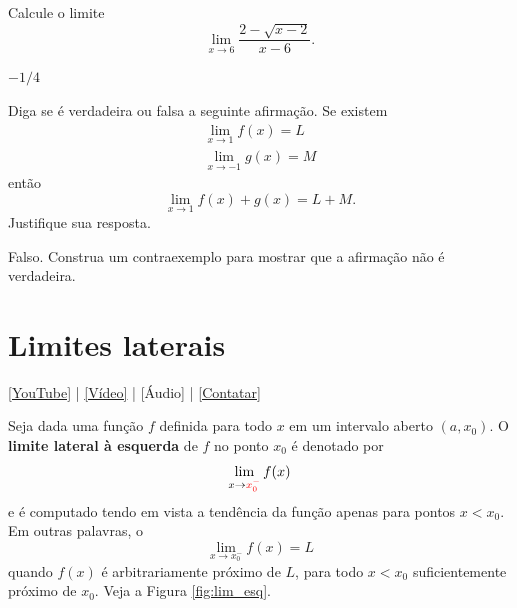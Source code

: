 \begin{exer}
  Calcule o limite
  \begin{equation}
    \lim_{x\to 6} \frac{2-\sqrt{x-2}}{x-6}.
  \end{equation}
\end{exer}
\begin{resp}
  $-1/4$
\end{resp}

\begin{exer}
  Diga se é verdadeira ou falsa a seguinte afirmação. Se existem
  \begin{gather}
    \lim_{x\to 1} f(x) = L\\
    \lim_{x\to -1} g(x) = M
  \end{gather}
  então
  \begin{equation}
    \lim_{x\to 1} f(x) + g(x) = L + M.
  \end{equation}
  Justifique sua resposta.
\end{exer}
\begin{resp}
  Falso. Construa um contraexemplo para mostrar que a afirmação não é verdadeira. 
\end{resp}


\section{Limites laterais}\label{cap_lim_sec_lateral}

\begin{flushright}
  \href{https://youtu.be/BFJPIejdyZM}{[YouTube]} | \href{https://archive.org/details/video_20220708_1407}{[Vídeo]} | [Áudio] | \href{https://phkonzen.github.io/notas/contato.html}{[Contatar]}
\end{flushright}

Seja dada uma função $f$ definida para todo $x$ em um intervalo aberto $(a, x_0)$. O {\bf limite lateral à esquerda} de $f$ no ponto $x_0$ é denotado por
\begin{equation}
  \lim_{x\to {\color{red}x_0^-}} f(x)
\end{equation}
e é computado tendo em vista a tendência da função apenas para pontos $x<x_0$. Em outras palavras, o
\begin{equation}
  \lim_{x\to x_0^-} f(x) = L
\end{equation}
quando $f(x)$ é arbitrariamente próximo de $L$, para todo $x<x_0$ suficientemente próximo de $x_0$. Veja a Figura \ref{fig:lim_esq}.

